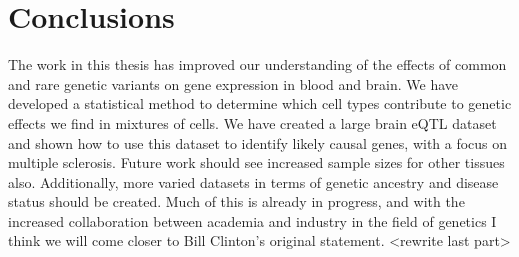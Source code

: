 \section{Conclusions}
The work in this thesis has improved our understanding of the effects of common and rare genetic variants on gene expression in blood and brain. We have developed a statistical method to determine which cell types contribute to genetic effects we find in mixtures of cells. We have created a large brain eQTL dataset and shown how to use this dataset to identify likely causal genes, with a focus on multiple sclerosis. Future work should see increased sample sizes for other tissues also. Additionally, more varied datasets in terms of genetic ancestry and disease status should be created. Much of this is already in progress, and with the increased collaboration between academia and industry in the field of genetics I think we will come closer to Bill Clinton's original statement. <rewrite last part> 





